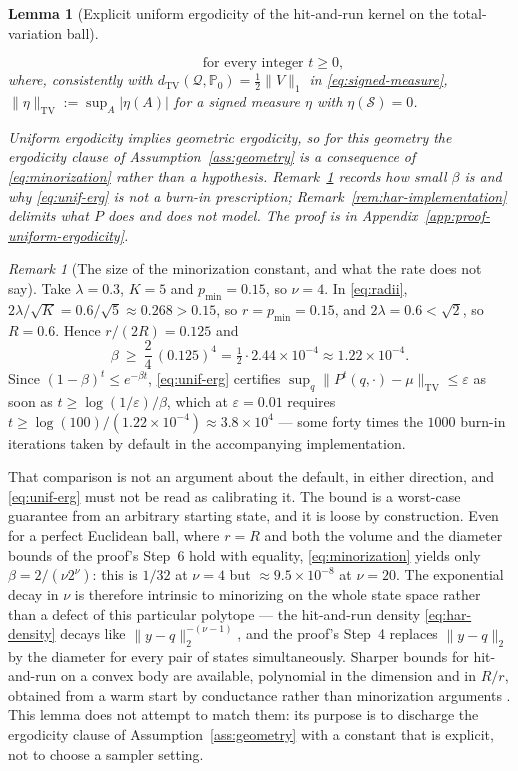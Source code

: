 \documentclass[11pt]{article}
\theoremstyle{plain}
\newtheorem{lemma}[theorem]{Lemma}
\theoremstyle{definition}
\theoremstyle{remark}
\newtheorem{remark}[theorem]{Remark}
\newcommand{\PP}{\mathbb{P}}
\newcommand{\cS}{\mathcal{S}}
\newcommand{\Q}{\mathcal{Q}}
\begin{document}
\begin{lemma}[Explicit uniform ergodicity of the hit-and-run kernel on the
total-variation ball]
\begin{enumerate}[label=(\alph*)]
\begin{equation}
        \qquad\text{for every integer }t\ge0,
    \end{equation}
    where, consistently with $d_{\mathrm{TV}}(\Q,\PP_0)=\tfrac12\|V\|_1$ in
    \eqref{eq:signed-measure}, $\|\eta\|_{\mathrm{TV}}:=\sup_A|\eta(A)|$ for a signed
    measure $\eta$ with $\eta(\cS)=0$.
\end{enumerate}
Uniform ergodicity implies geometric ergodicity, so for this geometry the ergodicity
clause of Assumption~\ref{ass:geometry} is a consequence of \eqref{eq:minorization}
rather than a hypothesis. Remark~\ref{rem:beta-magnitude} records how small $\beta$
is and why \eqref{eq:unif-erg} is not a burn-in prescription;
Remark~\ref{rem:har-implementation} delimits what $P$ does and does not model. The
proof is in Appendix~\ref{app:proof-uniform-ergodicity}.
\end{lemma}

\begin{remark}[The size of the minorization constant, and what the rate does not
say]\label{rem:beta-magnitude}
Take $\lambda=0.3$, $K=5$ and $p_{\min}=0.15$, so $\nu=4$. In \eqref{eq:radii},
$2\lambda/\sqrt K=0.6/\sqrt5\approx0.268>0.15$, so $r=p_{\min}=0.15$, and
$2\lambda=0.6<\sqrt2$, so $R=0.6$. Hence $r/(2R)=0.125$ and
\[
    \beta\ \ge\ \frac24\,(0.125)^4 = \tfrac12\cdot2.44\times10^{-4}
    \approx 1.22\times10^{-4}.
\]
Since $(1-\beta)^t\le e^{-\beta t}$, \eqref{eq:unif-erg} certifies
$\sup_{q}\|P^t(q,\cdot)-\mu\|_{\mathrm{TV}}\le\varepsilon$ as soon as
$t\ge\log(1/\varepsilon)/\beta$, which at $\varepsilon=0.01$ requires
$t\ge\log(100)/(1.22\times10^{-4})\approx3.8\times10^4$ --- some forty times the $1000$
burn-in iterations taken by default in the accompanying implementation.

That comparison is not an argument about the default, in either direction, and
\eqref{eq:unif-erg} must not be read as calibrating it. The bound is a worst-case
guarantee from an arbitrary starting state, and it is loose by construction. Even for a
perfect Euclidean ball, where $r=R$ and both the volume and the diameter bounds of the
proof's Step~6 hold with equality, \eqref{eq:minorization} yields only
$\beta=2/(\nu2^\nu)$: this is $1/32$ at $\nu=4$ but $\approx9.5\times10^{-8}$ at
$\nu=20$. The exponential decay in $\nu$ is therefore intrinsic to minorizing on the
whole state space rather than a defect of this particular polytope --- the hit-and-run
density \eqref{eq:har-density} decays like $\|y-q\|_2^{-(\nu-1)}$, and the proof's
Step~4 replaces $\|y-q\|_2$ by the diameter for every pair of states simultaneously.
Sharper bounds for hit-and-run on a convex body are available, polynomial in the
dimension and in $R/r$, obtained from a warm start by conductance rather than
minorization arguments \citep{lovasz1999hitandrun}. This lemma does not attempt to match
them: its purpose is to discharge the ergodicity clause of
Assumption~\ref{ass:geometry} with a constant that is explicit, not to choose a sampler
setting.
\end{remark}
\end{document}
